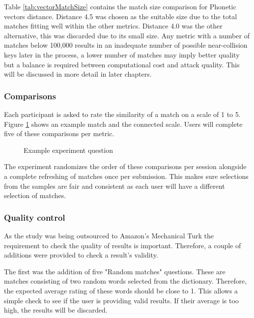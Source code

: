 Table \ref{tab:vectorMatchSize} contains the match size comparison for Phonetic vectors distance. Distance 4.5 was chosen as the suitable size due to the total matches fitting well within the other metrics. Distance 4.0 was the other alternative, this was discarded due to its small size. Any metric with a number of matches below 100,000 results in an inadequate number of possible near-collision keys later in the process, a lower number of matches may imply better quality but a balance is required between computational cost and attack quality. This will be discussed in more detail in later chapters.

\newpage

\subsubsection{Comparisons}
Each participant is asked to rate the similarity of a match on a scale of 1 to 5. Figure \ref{fig:phoneticMatch} shows an example match and the connected scale. Users will complete five of these comparisons per metric.

\begin{figure}[h!]
    \centering
    \caption{Example experiment question}
    \label{fig:phoneticMatch}
\end{figure}

The experiment randomizes the order of these comparisons per session alongside a complete refreshing of matches once per submission. This makes sure selections from the samples are fair and consistent as each user will have a different selection of matches.

\subsubsection{Quality control}
\label{sec:exp1_qualitycontrol}
As the study was being outsourced to Amazon's Mechanical Turk the requirement to check the quality of results is important. Therefore, a couple of additions were provided to check a result's validity.

The first was the addition of five "Random matches" questions. These are matches consisting of two random words selected from the dictionary. Therefore, the expected average rating of these words should be close to 1. This allows a simple check to see if the user is providing valid results. If their average is too high, the results will be discarded.

